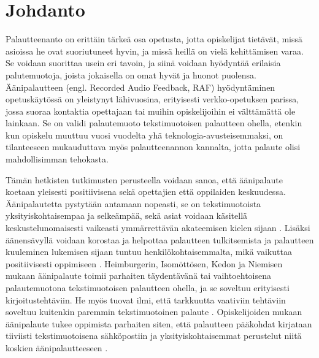\documentclass[utf8]{gradu3}
\begin{document}
\author{Erkko Mäkinen}


\maketitle


\mainmatter

\chapter{Johdanto}

Palautteenanto on erittäin tärkeä osa opetusta, jotta opiskelijat tietävät, missä asioissa he ovat suoriutuneet hyvin, ja missä heillä on vielä kehittämisen varaa. Se voidaan suorittaa usein eri tavoin, ja siinä voidaan hyödyntää erilaisia palutemuotoja, joista jokaisella on omat hyvät ja huonot puolensa. Äänipalautteen (engl. Recorded Audio Feedback, RAF) hyödyntäminen opetuskäytössä on yleistynyt lähivuosina, erityisesti verkko-opetuksen parissa, jossa suoraa kontaktia opettajaan tai muihin opiskelijoihin ei välttämättä ole lainkaan. Se on validi palautemuoto tekstimuotoisen palautteen ohella, etenkin kun opiskelu muuttuu vuosi vuodelta yhä teknologia-avusteisemmaksi, on tilanteeseen mukauduttava myös palautteenannon kannalta, jotta palaute olisi mahdollisimman tehokasta.

Tämän hetkisten tutkimusten perusteella voidaan sanoa, että äänipalaute koetaan yleisesti positiivisena sekä opettajien että oppilaiden keskuudessa. Äänipalautetta pystytään antamaan nopeasti, se on tekstimuotoista yksityiskohtaisempaa ja selkeämpää, sekä asiat voidaan käsitellä keskustelunomaisesti vaikeasti ymmärrettävän akateemisen kielen sijaan \parencite[][]{developing}. Lisäksi äänensävyllä voidaan korostaa ja helpottaa palautteen tulkitsemista ja palautteen kuuleminen lukemisen sijaan tuntuu henkilökohtaisemmalta, mikä vaikuttaa positiivisesti oppimiseen \parencite[][]{attitudes}. Heimburgerin, Isomöttösen, Kedon ja Niemisen \parencite*[][]{academics} mukaan äänipalaute toimii parhaiten täydentävänä tai vaihtoehtoisena palautemuotona tekstimuotoisen palautteen ohella, ja se soveltuu erityisesti kirjoitustehtäviin. He myös tuovat ilmi, että tarkkuutta vaativiin tehtäviin soveltuu kuitenkin paremmin tekstimuotoinen palaute \parencite[][]{academics}. Opiskelijoiden mukaan äänipalaute tukee oppimista parhaiten siten, että palautteen pääkohdat kirjataan tiiviisti tekstimuotoisena sähköpostiin ja yksityiskohtaisemmat perustelut niitä koskien äänipalautteeseen \parencite[][]{using}.
\end{document}
